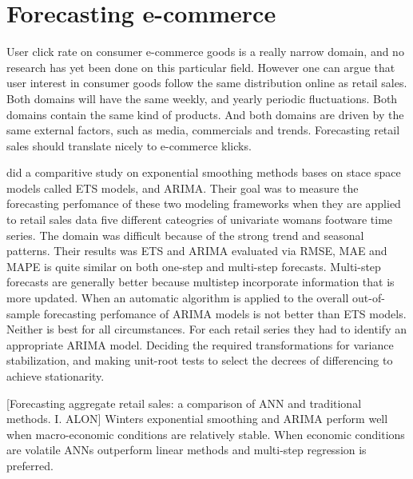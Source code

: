 \section{Forecasting e-commerce}
\label{section:RelatedWork:forecasting-ecommerce}
User click rate on consumer e-commerce goods is a really narrow domain, and no
research has yet been done on this particular field.
However one can argue that user interest in consumer goods follow the same distribution
online as retail sales.
Both domains will have the same weekly, and yearly periodic fluctuations.
Both domains contain the same kind of products.
And both domains are driven by the same external factors, such as media, commercials 
and trends.
Forecasting retail sales should translate nicely to e-commerce klicks.

\cite{Ramos2015} did a comparitive study on exponential smoothing 
methods bases on stace space models called ETS models, and ARIMA.
Their goal was to measure the forecasting perfomance of these two modeling frameworks
when they are applied to retail sales data
five different cateogries of univariate womans footware time series.
The domain was difficult because of the strong trend and seasonal patterns.
Their results was ETS and ARIMA evaluated via RMSE, MAE and MAPE is quite similar on both
one-step and multi-step forecasts. Multi-step forecasts are generally better
because multistep incorporate information that is more updated.
When an automatic algorithm is applied to the overall out-of-sample
forecasting perfomance of ARIMA models is not better than ETS models.
Neither is best for all circumstances.
For each retail series they had to identify an appropriate ARIMA model.
Deciding the required transformations for variance stabilization, and making unit-root
tests to select the decrees of differencing to achieve stationarity.


[Forecasting aggregate retail sales: a comparison of ANN and traditional methods. I. ALON]
Winters exponential smoothing and ARIMA perform well when macro-economic
conditions are relatively stable. When economic conditions are volatile
ANNs outperform linear methods and multi-step regression is preferred.

